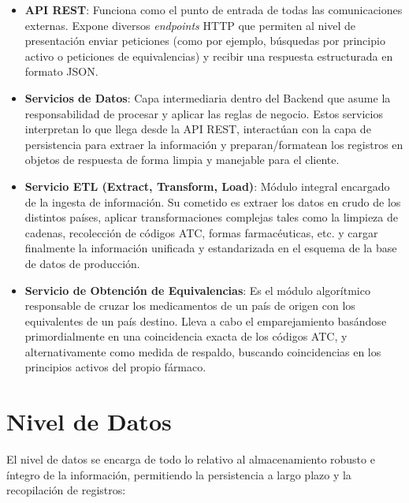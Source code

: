 \documentclass[12pt, a4paper]{report}
\begin{document}
\begin{itemize}
    \item \textbf{API REST}: Funciona como el punto de entrada de todas las comunicaciones externas. Expone diversos \textit{endpoints} HTTP que permiten al nivel de presentación enviar peticiones (como por ejemplo, búsquedas por principio activo o peticiones de equivalencias) y recibir una respuesta estructurada en formato JSON.

    \item \textbf{Servicios de Datos}: Capa intermediaria dentro del Backend que asume la responsabilidad de procesar y aplicar las reglas de negocio. Estos servicios interpretan lo que llega desde la API REST, interactúan con la capa de persistencia para extraer la información y preparan/formatean los registros en objetos de respuesta de forma limpia y manejable para el cliente.

    \item \textbf{Servicio ETL (Extract, Transform, Load)}: Módulo integral encargado de la ingesta de información. Su cometido es extraer los datos en crudo de los distintos países, aplicar transformaciones complejas tales como la limpieza de cadenas, recolección de códigos ATC, formas farmacéuticas, etc. y cargar finalmente la información unificada y estandarizada en el esquema de la base de datos de producción.

    \item \textbf{Servicio de Obtención de Equivalencias}: Es el módulo algorítmico responsable de cruzar los medicamentos de un país de origen con los equivalentes de un país destino. Lleva a cabo el emparejamiento basándose primordialmente en una coincidencia exacta de los códigos ATC, y alternativamente como medida de respaldo, buscando coincidencias en los principios activos del propio fármaco.
\end{itemize}

\section{Nivel de Datos}

El nivel de datos se encarga de todo lo relativo al almacenamiento robusto e íntegro de la información, permitiendo la persistencia a largo plazo y la recopilación de registros:
\end{document}

